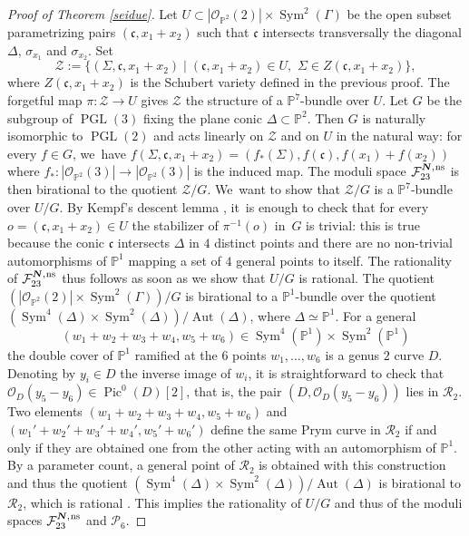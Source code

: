 \documentclass[JEP,XML,SOM,Unicode,NoEqCountersInSection,published]{cedram}
\newcommand{\ns}{{\mkern1mu\mathrm{ns}}}
\newcommand{\bN}{\boldsymbol{N}}
\theoremstyle{plain}
\theoremstyle{definition}
\DeclareMathOperator{\Aut}{Aut}
\DeclareMathOperator{\PGL}{PGL}
\DeclareMathOperator{\Pic}{Pic}
\DeclareMathOperator{\Sym}{Sym}
\newcommand\PP{{\mathbb P}}
\newcommand\F{{\mathcal F}}
\renewcommand\P{{\mathcal P}}
\begin{document}
\begin{proof}[Proof of Theorem \ref{seidue}]
Let $U\subset |\mathcal{O}_{\PP^2}(2)|\times \Sym^2(\Gamma)$ be the open subset parametrizing pairs $(\mathfrak{c}, x_1+x_2)$ such that $\mathfrak{c}$ intersects transversally the diagonal $\Delta$, $\sigma_{x_1}$ and $\sigma_{x_2}$. Set
\[
\mathcal Z:=\bigl\{(\Sigma,\mathfrak{c}, x_1+x_2)\mid (\mathfrak{c}, x_1+x_2)\in U,\,\, \Sigma\in Z(\mathfrak{c}, x_1+x_2) \bigr\},
\]
where $Z(\mathfrak{c}, x_1+x_2)$ is the Schubert variety defined in the previous proof. The forgetful map $\pi:\mathcal Z\to U$ gives $\mathcal Z$ the structure of a $\PP^7$-bundle over $U$. Let $G$ be the subgroup of $\PGL(3)$ fixing the plane conic $\Delta\subset \PP^2$. Then $G$ is naturally isomorphic to $\PGL(2)$ and acts linearly on $\mathcal Z$ and on $U$ in the natural way: for every $f\in G$, we~have $f(\Sigma,\mathfrak{c}, x_1+x_2)=(f_*(\Sigma),f(\mathfrak{c}), f(x_1)+f(x_2))$ where $f_*:|\mathcal{O}_{\PP^2}(3)|\to |\mathcal{O}_{\PP^2}(3)|$ is the induced map. The moduli space $\F_{23}^{\bN,\ns}$ is then birational to the quotient $\mathcal Z / G$. We~want to show that $\mathcal Z / G$ is a $\PP^7$-bundle over $U/G$. By
Kempf's descent lemma \cite{DN}, it~is enough to check that for every $o=(\mathfrak{c}, x_1+x_2)\in U$ the stabilizer of $\pi^{-1}(o)$ in~$G$ is trivial: this is true because the conic $\mathfrak{c}$ intersects $\Delta$ in $4$ distinct points and there are no non-trivial automorphisms of $\PP^1$ mapping a set of $4$ general points to itself. The rationality of $\F_{23}^{\bN,\ns}$ thus follows as soon as we show that $U/G$ is rational. The quotient $(|\mathcal{O}_{\PP^2}(2)|\times \Sym^2(\Gamma))/G$ is birational to a $\PP^1$-bundle over the quotient $\left(\Sym^4(\Delta)\times \Sym^2(\Delta)\right)/\Aut(\Delta)$, where $\Delta\simeq \PP^1$. For a general
\[
(w_1+w_2+w_3+w_4,w_5+w_6)\in\Sym^4(\PP^1)\times \Sym^2(\PP^1)
\]
the double cover of $\PP^1$ ramified at the $6$ points $w_1,\ldots,w_6$ is a genus $2$ curve $D$. Denoting by $y_i\in D$ the inverse image of $w_i$, it is straightforward to check that $\mathcal O_D(y_5- y_6)\in \Pic^0(D)[2]$, that is, the pair $(D,\mathcal O_D(y_5-y_6))$ lies in $\mathcal R_2$. Two elements $(w_1+w_2+w_3+w_4,w_5+w_6)$ and $(w_1'+w_2'+w_3'+w_4',w_5'+w_6')$ define the same Prym curve in $\mathcal R_2$ if and only if they are obtained one from the other acting with an automorphism of $\PP^1$. By a parameter count, a general point of $\mathcal R_2$ is obtained with this construction and thus the quotient $\left(\Sym^4(\Delta)\times \Sym^2(\Delta)\right)/\Aut(\Delta)$ is birational to $\mathcal R_2$, which is rational \cite{Do}. This implies the rationality of $U/G$ and thus of the moduli spaces $\F_{23}^{\bN,\ns}$ and $\P_{6}$.


\end{proof}
\end{document}
